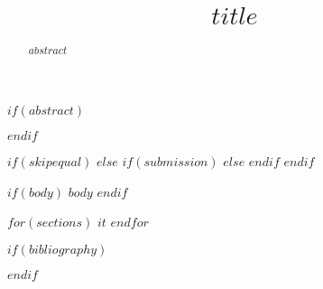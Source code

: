 \documentclass{article}
\title{$title$}
\begin{document}
\maketitle

$if(abstract)$
\begin{abstract}
  $abstract$
\end{abstract}
$endif$

$if(skipequal)$
$else$
$if(submission)$
$else$
$endif$
$endif$

$if(body)$
$body$
$endif$

$for(sections)$
$it$
$endfor$

$if(bibliography)$


$endif$


\end{document}
